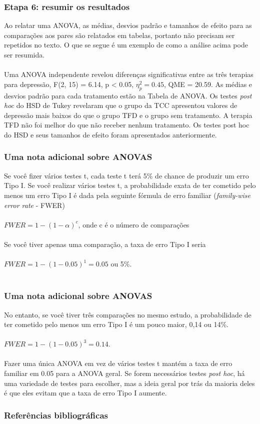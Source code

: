 \documentclass[11pt]{beamer}
\begin{document}
\begin{frame}
\frametitle{Etapa 6: resumir os resultados}

Ao relatar uma ANOVA, as médias, desvios padrão e tamanhos de efeito para as comparações aos pares são relatados em tabelas, portanto não precisam ser repetidos no texto. O que se segue é um exemplo de como a análise acima pode ser resumida.\\~\\

Uma ANOVA independente revelou diferenças significativas entre as três terapias para depressão, F(2, 15) = 6.14, p < 0.05, $\eta_p^2 = 0.45$, QME = 20.59. As médias e desvios padrão para cada tratamento estão na Tabela de ANOVA. Os testes \textit{post hoc} do HSD de Tukey revelaram que o grupo da TCC apresentou valores de depressão mais baixos do que o grupo TFD e o grupo sem tratamento. A terapia TFD não foi melhor do que não receber nenhum tratamento. Os testes post hoc do HSD e seus tamanhos de efeito foram apresentados anteriormente.

\end{frame}

\begin{frame}
\frametitle{Uma nota adicional sobre ANOVAS}
Se você fizer vários testes t, cada teste t terá 5\% de chance de produzir um erro Tipo I. Se você realizar vários testes t, a probabilidade exata de ter cometido pelo menos um erro Tipo I é dada pela seguinte fórmula de erro familiar (\textit{family-wise error rate} - FWER)\\~\\

$FWER = 1-(1-\alpha)^c$, onde c é o número de comparações\\~\\

Se você tiver apenas uma comparação, a taxa de erro Tipo I seria\\~\\

$FWER = 1 - (1-0.05)^1 = 0.05$ ou 5\%.\\~\\


\end{frame}

\begin{frame}
\frametitle{Uma nota adicional sobre ANOVAS}
No entanto, se você tiver três comparações no mesmo estudo, a probabilidade de ter cometido pelo menos um erro Tipo I é um pouco maior, 0,14 ou 14\%.\\~\\

$FWER = 1 - (1 - 0.05)^3 = 0.14$.\\~\\

Fazer uma única ANOVA em vez de vários testes t mantém a taxa de erro familiar em 0.05 para a ANOVA geral. Se forem necessários testes \textit{post hoc}, há uma variedade de testes para escolher, mas a ideia geral por trás da maioria deles é que eles evitam que a taxa de erro Tipo I aumente.

\end{frame}

\begin{frame}
\frametitle{Referências bibliográficas}
\printbibliography
\end{frame}
\end{document}
